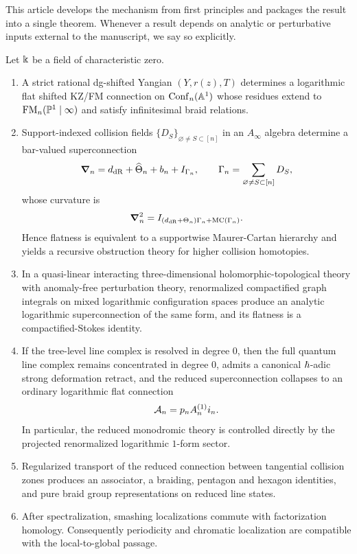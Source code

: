 This article develops the mechanism from first principles and packages the result into a single theorem. Whenever a result depends on analytic or perturbative inputs external to the manuscript, we say so explicitly.

\begin{theorem}%
Let $\Bbbk$ be a field of characteristic zero.
\begin{enumerate}[label=\textup{(\roman*)}]
 \item A strict rational dg-shifted Yangian $(Y,r(z),T)$ determines a logarithmic flat shifted KZ/FM connection on $\mathrm{Conf}_n(\mathbb A^1)$ whose residues extend to $\mathrm{FM}_n(\mathbb P^1\mid\infty)$ and satisfy infinitesimal braid relations.
 \item Support-indexed collision fields $\{D_S\}_{\varnothing\neq S\subset[n]}$ in an $A_\infty$ algebra determine a bar-valued superconnection
 \[
 \boldsymbol{\nabla}_n=d_{\mathrm{dR}}+\widehat\Theta_n+b_n+I_{\Gamma_n},\qquad \Gamma_n=\sum_{\varnothing\neq S\subset[n]}D_S,
 \]
 whose curvature is
 \[
 \boldsymbol{\nabla}_n^2 = I_{(d_{\mathrm{dR}}+\Theta_n)\Gamma_n+\mathrm{MC}(\Gamma_n)}.
 \]
 Hence flatness is equivalent to a supportwise Maurer-Cartan hierarchy and yields a recursive obstruction theory for higher collision homotopies.
 \item In a quasi-linear interacting three-dimensional holomorphic-topological theory with anomaly-free perturbation theory, renormalized compactified graph integrals on mixed logarithmic configuration spaces produce an analytic logarithmic superconnection of the same form, and its flatness is a compactified-Stokes identity.
 \item If the tree-level line complex is resolved in degree $0$, then the full quantum line complex remains concentrated in degree $0$, admits a canonical $\hbar$-adic strong deformation retract, and the reduced superconnection collapses to an ordinary logarithmic flat connection
 \[
 \mathcal A_n = p_n A_n^{(1)} i_n.
 \]
 In particular, the reduced monodromic theory is controlled directly by the projected renormalized logarithmic $1$-form sector.
 \item Regularized transport of the reduced connection between tangential collision zones produces an associator, a braiding, pentagon and hexagon identities, and pure braid group representations on reduced line states.
 \item After spectralization, smashing localizations commute with factorization homology. Consequently periodicity and chromatic localization are compatible with the local-to-global passage.
\end{enumerate}
\end{theorem}


